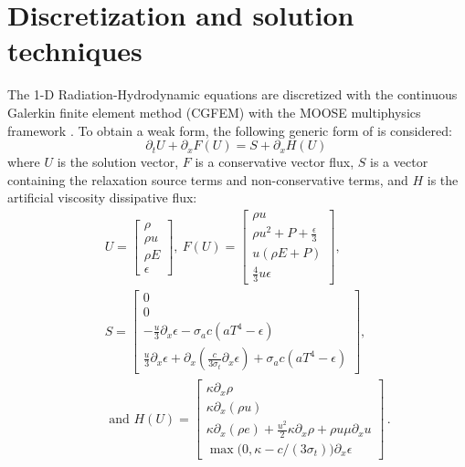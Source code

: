 \documentclass[review]{elsarticle}
\begin{document}
\section{Discretization and solution techniques}\label{sec:discr}
%
The 1-D Radiation-Hydrodynamic equations  are discretized with the continuous Galerkin finite element method (CGFEM) with the MOOSE multiphysics framework \cite{Moose}. To obtain a weak form, the following generic form of  is considered:
\begin{equation}
\label{eq:form}
\partial_t U + \partial_x F \left( U \right) = S + \partial_x H \left(U\right) \,
\end{equation}
where $U$ is the solution vector, $F$ is a conservative vector flux, $S$ is a vector containing the relaxation source terms and non-conservative terms, and $H$ is the artificial viscosity dissipative flux:
\begin{eqnarray*}
&&U = 
\begin{bmatrix}
\rho \\
\rho u \\
\rho E \\
\epsilon
\end{bmatrix}
,\
F(U) = 
\begin{bmatrix}
\rho u \\
\rho u^2 + P + \frac{\epsilon}{3} \\
u \left( \rho E + P \right) \\
\frac{4}{3} u \epsilon
\end{bmatrix}
,\ \\
&&S = 
\begin{bmatrix}
0 \\
0 \\
-\frac{u}{3} \partial_x \epsilon - \sigma_a c \left( a T^4 - \epsilon \right) \\
\frac{u}{3} \partial_x \epsilon + \partial_x \left( \frac{c}{3 \sigma_t} \partial_x \epsilon \right) + \sigma_a c \left( a T^4 - \epsilon \right)
\end{bmatrix}
,
\\
&&\text{ and } 
H(U) = 
\begin{bmatrix}
\kappa \partial_x \rho \\
\kappa \partial_x (\rho u) \\
\kappa \partial_x \left( \rho e \right) + \frac{u^2}{2} \kappa \partial_x \rho + \rho u \mu \partial_x u \\
\max \big( 0, \kappa- c/(3 \sigma_t) \big) \partial_x \epsilon 
\end{bmatrix} \,.
\end{eqnarray*}
\end{document}
